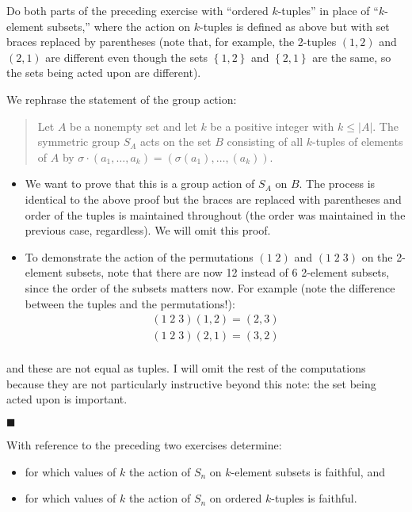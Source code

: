\documentclass[12pt]{article}
\renewcommand{\qed}{\hfill$\blacksquare$}
\renewenvironment{proof}{\begin{addmargin}[1em]{0em}\begin{newproof}}{\end{newproof}\end{addmargin}\qed}
\newenvironment{problem}[2][Exercise]{\begin{trivlist}
\item[\hskip \labelsep {\bfseries #1}\hskip \labelsep {\bfseries #2.}]}{\end{trivlist}}
\begin{document}
\begin{problem}{1.7.9}
Do both parts of the preceding exercise with ``ordered $k$-tuples'' in place of ``$k$-element subsets,'' where the action on $k$-tuples is defined as above but with set braces replaced by parentheses (note that, for example, the 2-tuples $\left(1,2\right)$ and $\left(2,1\right)$ are different even though the sets $\left\{1,2\right\}$ and $\left\{2,1\right\}$ are the same, so the sets being acted upon are different).
\end{problem}
\begin{proof}
We rephrase the statement of the group action:
\begin{quote}
    Let $A$ be a nonempty set and let $k$ be a positive integer with $k\leq \left|A\right|$. The symmetric group $S_A$ acts on the set $B$ consisting of all $k$-tuples of elements of $A$ by $\sigma\cdot \left(a_1,\ldots,a_k\right) = \left(\sigma\left(a_1\right),\ldots,\left(a_k\right)\right)$.
\end{quote}
\begin{itemize}
    \item We want to prove that this is a group action of $S_A$ on $B$. The process is identical to the above proof but the braces are replaced with parentheses and order of the tuples is maintained throughout (the order was maintained in the previous case, regardless). We will omit this proof.
    \item To demonstrate the action of the permutations $\left(1\;2\right)$ and $\left(1\;2\;3\right)$ on the 2-element subsets, note that there are now 12 instead of 6 2-element subsets, since the order of the subsets matters now. For example (note the difference between the tuples and the permutations!):
    \begin{equation*}
        \begin{split}
            \left(1\;2\;3\right) \left( 1,2\right) = \left(2,3 \right) \\
            \left(1\;2\;3\right) \left( 2,1 \right) = \left(3,2 \right) \\
        \end{split}
    \end{equation*}
\end{itemize}
and these are not equal as tuples. I will omit the rest of the computations because they are not particularly instructive beyond this note: {\color{red}the set being acted upon is important}.
\end{proof}


\begin{problem}{1.7.10}
With reference to the preceding two exercises determine:
\begin{itemize}
    \item for which values of $k$ the action of $S_n$ on $k$-element subsets is faithful, and
    \item for which values of $k$ the action of $S_n$ on ordered $k$-tuples is faithful.
\end{itemize}
\end{problem}
\end{document}
